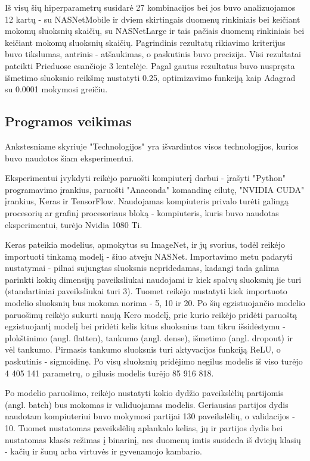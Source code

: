 \documentclass{VUMIFPSbakalaurinis}
\begin{document}
Iš visų šių hiperparametrų susidarė 27 kombinacijos bei jos buvo analizuojamos 12 kartų - su NASNetMobile ir dviem skirtingais duomenų rinkiniais bei keičiant mokomų sluoksnių skaičių, su NASNetLarge ir tais pačiais duomenų rinkiniais bei keičiant mokomų sluoksnių skaičių.
Pagrindinis rezultatų rikiavimo kriterijus buvo tikslumas, antrinis - atšaukimas, o paskutinis buvo precizija. Visi rezultatai pateikti Prieduose esančioje 3 lentelėje. 
Pagal gautus rezultatus buvo nuspręsta išmetimo sluoksnio reikšmę nustatyti 0.25, optimizavimo funkciją kaip Adagrad su 0.0001 mokymosi greičiu.


\subsection{Programos veikimas}
Ankstesniame skyriuje "Technologijos" yra išvardintos visos technologijos, kurios buvo naudotos šiam eksperimentui.

Eksperimentui įvykdyti reikėjo paruošti kompiuterį darbui - įrašyti "Python" programavimo įrankius, paruošti "Anaconda" komandinę eilutę, "NVIDIA CUDA" įrankius, Keras ir 
TensorFlow. Naudojamas kompiuteris privalo turėti galingą procesorių ar grafinį procesoriaus bloką - kompiuteris, kuris buvo naudotas eksperimentui, turėjo Nvidia 1080 Ti. 
 
Keras pateikia modelius, apmokytus su ImageNet, ir jų svorius, todėl reikėjo importuoti 
tinkamą modelį - šiuo atveju NASNet. Importavimo metu padaryti nustatymai - pilnai sujungtas sluoksnis nepridedamas, kadangi tada galima parinkti kokių dimensijų 
paveiksliukai naudojami ir kiek spalvų sluoksnių jie turi (standartiniai paveiksliukai turi 3). Tuomet reikėjo nustatyti kiek importuoto modelio sluoksnių bus mokoma norima - 5, 10 ir 20. 
Po šių egzistuojančio modelio paruošimų reikėjo sukurti naują Kero modelį, prie kurio reikėjo pridėti paruoštą egzistuojantį modelį bei pridėti kelis kitus sluoksnius tam tikru išsidėstymu - 
plokštinimo (angl. flatten), tankumo (angl. dense), išmetimo (angl. dropout) ir vėl tankumo. Pirmasis tankumo sluoksnis turi aktyvacijos funkciją ReLU, o paskutinis - sigmoidinę. 
Po visų sluoksnių pridėjimo negilus modelis iš viso turėjo 4 405 141 parametrų, o gilusis modelis turėjo 85 916 818.

Po modelio paruošimo, reikėjo nustatyti kokio dydžio paveikslėlių partijomis (angl. batch) bus mokomas ir validuojamas modelis. Geriausias partijos dydis naudotam kompiuteriui buvo mokymosi partijai 130 paveikslėlių, o validacijos - 10.
Tuomet nustatomas paveikslėlių aplankalo kelias, jų ir partijos dydis bei nustatomas klasės režimas į binarinį, nes duomenų imtis susideda iš dviejų klasių - kačių ir šunų arba virtuvės ir gyvenamojo kambario.
\end{document}
